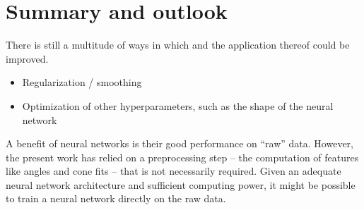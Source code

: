 \chapter{Summary and outlook}

There is still a multitude of ways in which \dsea and the application thereof could be improved.
\begin{itemize}
  \item Regularization / smoothing
  \item Optimization of other hyperparameters, such as the shape of the neural network
\end{itemize}

A benefit of neural networks is their good performance on \enquote{raw} data.
However,
the present work has relied on a preprocessing step %
  – the computation of features like angles and cone fits –
that is not necessarily required.
Given an adequate neural network architecture and sufficient computing power,
it might be possible to train a neural network directly on the raw data.


\blindtext[3]
